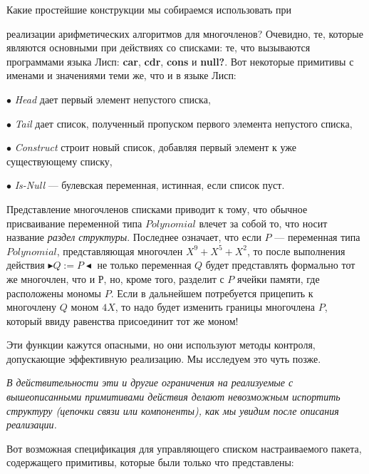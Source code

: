 \documentclass{../../template/mai_book}
\begin{document}
Какие простейшие конструкции мы собираемся использовать при

\newpage


\noindent
реализации арифметических алгоритмов для многочленов? Очевидно, те, которые являются основными при действиях со списками: те, что вызываются программами языка Лисп: \textbf{car}, \textbf{cdr}, \textbf{cons} и \textbf{null?}. Вот некоторые примитивы с именами и значениями теми же, что и в языке Лисп:

$\bullet$ \textit{Head} дает первый элемент непустого списка,

$\bullet$ \textit{Tail} дает список, полученный пропуском первого элемента 
непустого списка,

$\bullet$ \textit{Construct} строит новый список, добавляя первый элемент к уже существующему списку,

$\bullet$ \textit{Is-Null} — булевская переменная, истинная, если список пуст.

Представление многочленов списками приводит к тому, что обычное присваивание переменной типа $Polynomial$ влечет за собой то, что носит название \textit{раздел структуры}. Последнее означает, что если $P$ — переменная типа $Polynomial$, представляющая многочлен $X^9 + X^5 + X^2$, то после выполнения действия $\blacktriangleright Q := P \blacktriangleleft$ не только переменная $Q$ будет представлять формально тот же многочлен, что и Р, но, кроме того, разделит с $P$ ячейки памяти, где расположены мономы $P$. Если в дальнейшем потребуется прицепить к многочлену $Q$ моном $4X$, то надо будет изменить границы многочлена $P$, который ввиду равенства присоединит тот же моном!

Эти функции кажутся опасными, но они используют методы контроля, допускающие эффективную реализацию. Мы исследуем это чуть позже.

\textit{В действительности эти и другие ограничения на реализуемые с вышеописанными примитивами действия делают невозможным испортить структуру (цепочки связи или компоненты), как мы увидим после описания реализации.}

Вот возможная спецификация для управляющего списком настраиваемого пакета, содержащего примитивы, которые были только что представлены:

\newpage

\end{document}
